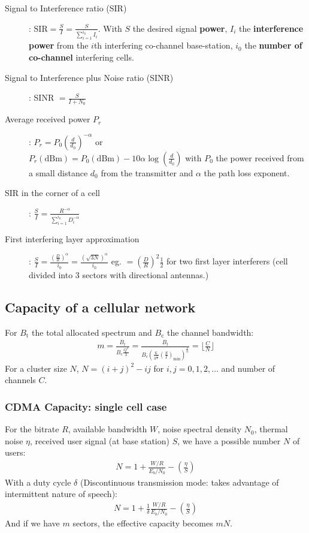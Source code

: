 \documentclass[6pt]{scrartcl}
\begin{document}
\begin{multicols}{4}
\begin{description}
\item[Signal to Interference ratio (SIR)]: $\textrm{SIR} = \frac{S}{I} = \frac{S}{\sum^{i_0}_{i=1}I_i}$. With $S$ the desired signal \textbf{power}, $I_i$ the \textbf{interference power} from the $i$th interfering co-channel base-station, $i_0$ the \textbf{number of co-channel} interfering cells.

\item[Signal to Interference plus Noise ratio (SINR)] : SINR $= \frac{S}{I + N_0}$

\item[Average received power $P_r$]: $P_r = P_0(\frac{d}{d_0})^{-\alpha}$ or \\ 
$P_r(\textrm{dBm}) = P_0(\textrm{dBm})-10\alpha\log(\frac{d}{d_0})$ with $P_0$ the power received from a small distance $d_0$ from the transmitter and $\alpha$ the path loss exponent.
	
\item[SIR in the corner of a cell]: $\frac{S}{I} = \frac{R^{-\alpha}}{\sum^{i_0}_{i=1}D_i^{-\alpha}}$

\item[First interfering layer approximation]: $\frac{S}{I} = \frac{(\frac{D}{R})^\alpha}{i_0} = \frac{(\sqrt{3N})^\alpha}{i_0}$ eg. $=(\frac{D}{R})^2\frac{1}{2}$ for two first layer interferers (cell divided into 3 sectors with directional antennas.)

\end{description}

\subsection{Capacity of a cellular network}
For $B_\textrm{t}$ the total allocated spectrum and $B_\textrm{c}$ the channel bandwidth: 
\begin{align*}
m = \frac{B_t}{B_c \frac{Q^2}{3}} = \frac{B_t}{B_c\left(\frac{6}{3^{\frac{\alpha}{2}}}\left(\frac{S}{I}\right)_\textrm{min}\right)^{\frac{2}{\alpha}}} = \lfloor\frac CN\rfloor
\end{align*}
For a cluster size $N$, $N = (i + j)^2 - ij$ for $i,j=0,1,2,\ldots$ and number of channels $C$.

\subsubsection{CDMA Capacity: single cell case}
For the bitrate $R$, available bandwidth $W$, noise spectral density $N_0$, thermal noise $\eta$, received user signal (at base station) $S$, we have a possible number $N$ of users:
\begin{align*}
	N = 1 + \frac{W/R}{E_b/N_0} - (\frac{\eta}{S})
\end{align*}
With a duty cycle $\delta$ (Discontinuous transmission mode: takes advantage of
intermittent nature of speech):
\begin{align*}
	N = 1 + \frac1\delta\frac{W/R}{E_b/N_0} - (\frac{\eta}{S})
\end{align*}
And if we have $m$ sectors, the effective capacity becomes $mN$.

\end{multicols}
\end{document}

